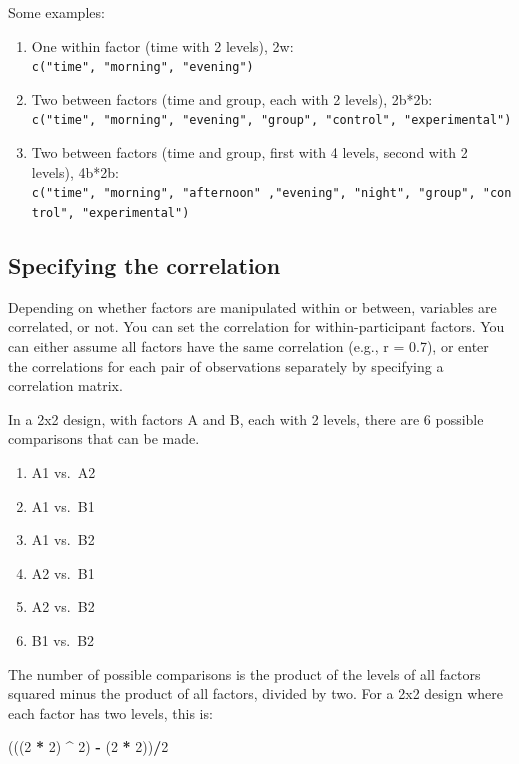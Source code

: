 \documentclass[]{book}
\newenvironment{Shaded}{\begin{snugshade}}{\end{snugshade}}
\newcommand{\DecValTok}[1]{\textcolor[rgb]{0.00,0.00,0.81}{#1}}
\newcommand{\NormalTok}[1]{#1}
\newcommand{\OperatorTok}[1]{\textcolor[rgb]{0.81,0.36,0.00}{\textbf{#1}}}
\newcommand{\StringTok}[1]{\textcolor[rgb]{0.31,0.60,0.02}{#1}}
\providecommand{\tightlist}{%
  \setlength{\itemsep}{0pt}\setlength{\parskip}{0pt}}
\begin{document}
Some examples:

\begin{enumerate}
\def\labelenumi{\arabic{enumi}.}
\tightlist
\item
  One within factor (time with 2 levels), 2w:
  \texttt{c("time",\ "morning",\ "evening")}
\item
  Two between factors (time and group, each with 2 levels), 2b*2b:
  \texttt{c("time",\ "morning",\ "evening",\ "group",\ "control",\ "experimental")}
\item
  Two between factors (time and group, first with 4 levels, second with 2 levels), 4b*2b:
  \texttt{c("time",\ "morning",\ "afternoon"\ ,"evening",\ "night",\ "group",\ "control",\ "experimental")}
\end{enumerate}

\hypertarget{specifying-the-correlation}{%
\subsection{Specifying the correlation}\label{specifying-the-correlation}}

Depending on whether factors are manipulated within or between, variables are correlated, or not. You can set the correlation for within-participant factors. You can either assume all factors have the same correlation (e.g., r = 0.7), or enter the correlations for each pair of observations separately by specifying a correlation matrix.

In a 2x2 design, with factors A and B, each with 2 levels, there are 6 possible comparisons that can be made.

\begin{enumerate}
\def\labelenumi{\arabic{enumi}.}
\tightlist
\item
  A1 vs.~A2
\item
  A1 vs.~B1
\item
  A1 vs.~B2
\item
  A2 vs.~B1
\item
  A2 vs.~B2
\item
  B1 vs.~B2
\end{enumerate}

The number of possible comparisons is the product of the levels of all factors squared minus the product of all factors, divided by two. For a 2x2 design where each factor has two levels, this is:

\begin{Shaded}
\begin{Highlighting}[]
\NormalTok{(((}\DecValTok{2} \OperatorTok{*}\StringTok{ }\DecValTok{2}\NormalTok{) }\OperatorTok{^}\StringTok{ }\DecValTok{2}\NormalTok{) }\OperatorTok{-}\StringTok{ }\NormalTok{(}\DecValTok{2} \OperatorTok{*}\StringTok{ }\DecValTok{2}\NormalTok{))}\OperatorTok{/}\DecValTok{2}
\end{Highlighting}
\end{Shaded}
\end{document}

